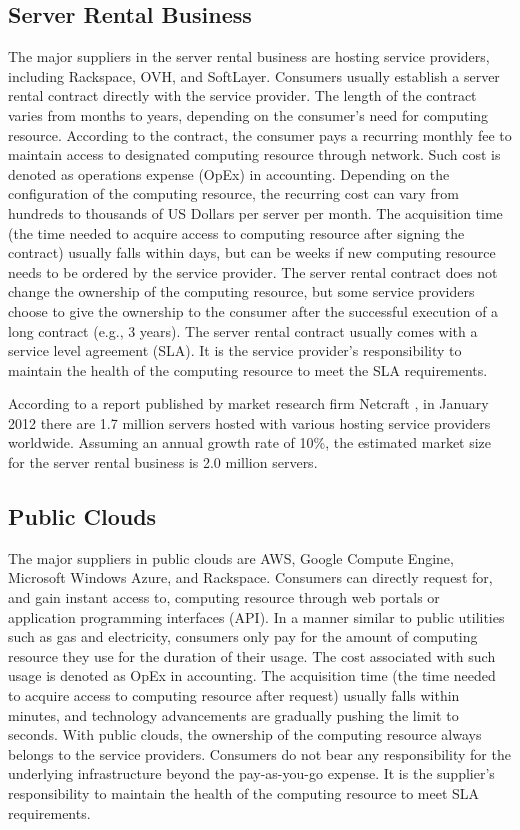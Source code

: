 \documentclass[10pt,journal,cspaper,compsoc]{IEEEtran}
\begin{document}
\subsection{Server Rental Business}
The major suppliers in the server rental business are hosting service providers, including Rackspace, OVH, and SoftLayer. Consumers usually establish a server rental contract directly with the service provider. The length of the contract varies from months to years, depending on the consumer's need for computing resource. According to the contract, the consumer pays a recurring monthly fee to maintain access to designated computing resource through network. Such cost is denoted as operations expense (OpEx) in accounting. Depending on the configuration of the computing resource, the recurring cost can vary from hundreds to thousands of US Dollars per server per month. The acquisition time (the time needed to acquire access to computing resource after signing the contract) usually falls within days, but can be weeks if new computing resource needs to be ordered by the service provider. The server rental contract does not change the ownership of the computing resource, but some service providers choose to give the ownership to the consumer after the successful execution of a long contract (e.g., 3 years). The server rental contract usually comes with a service level agreement (SLA). It is the service provider's responsibility to maintain the health of the computing resource to meet the SLA requirements.

According to a report published by market research firm Netcraft \cite{netcraft}, in January 2012 there are 1.7 million servers hosted with various hosting service providers worldwide. Assuming an annual growth rate of 10\%, the estimated market size for the server rental business is 2.0 million servers.

\subsection{Public Clouds}
The major suppliers in public clouds are AWS, Google Compute Engine,  Microsoft Windows Azure, and Rackspace. Consumers can directly request for, and gain instant access to, computing resource through web portals or application programming interfaces (API). In a manner similar to public utilities such as gas and electricity, consumers only pay for the amount of computing resource they use for the duration of their usage. The cost associated with such usage is denoted as OpEx in accounting. The acquisition time (the time needed to acquire access to computing resource after request) usually falls within minutes, and technology advancements are gradually pushing the limit to seconds. With public clouds, the ownership of the computing resource always belongs to the service providers. Consumers do not bear any responsibility for the underlying infrastructure beyond the pay-as-you-go expense. It is the supplier's responsibility to maintain the health of the computing resource to meet SLA requirements.
\end{document}
